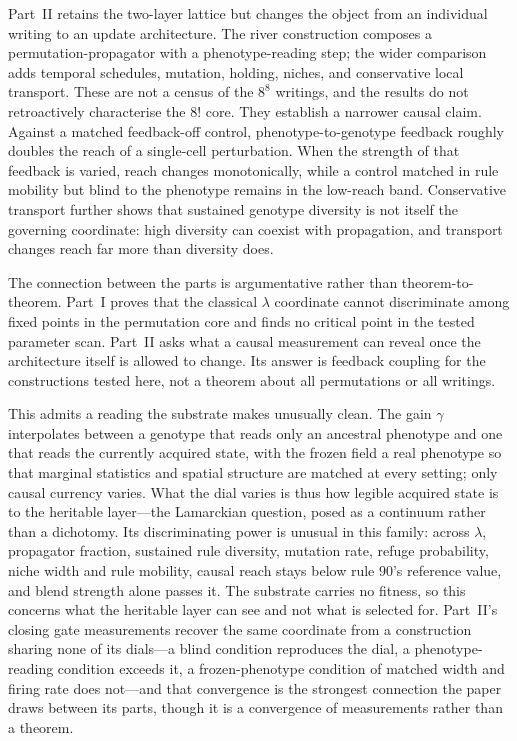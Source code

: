 \documentclass[man,12pt,floatsintext,donotrepeattitle]{apa7}
\begin{document}
Part~II retains the two-layer lattice but changes the object from an individual
writing to an update architecture. The river construction composes a
permutation-propagator with a phenotype-reading step; the wider comparison adds
temporal schedules, mutation, holding, niches, and conservative local
transport. These are not a census of the $8^8$ writings, and the results do not
retroactively characterise the $8!$ core. They establish a narrower causal
claim. Against a matched feedback-off control, phenotype-to-genotype feedback
roughly doubles the reach of a single-cell perturbation. When the strength of
that feedback is varied, reach changes monotonically, while a control matched
in rule mobility but blind to the phenotype remains in the low-reach band.
Conservative transport further shows that sustained genotype diversity is not
itself the governing coordinate: high diversity can coexist with propagation,
and transport changes reach far more than diversity does.

The connection between the parts is argumentative rather than
theorem-to-theorem. Part~I proves that the classical $\lambda$ coordinate cannot
discriminate among fixed points in the permutation core and finds no critical
point in the tested parameter scan. Part~II asks what a causal measurement can
reveal once the architecture itself is allowed to change. Its answer is
feedback coupling for the constructions tested here, not a theorem about all
permutations or all writings.

This admits a reading the substrate makes unusually clean. The gain $\gamma$
interpolates between a genotype that reads only an ancestral phenotype and one
that reads the currently acquired state, with the frozen field a real phenotype
so that marginal statistics and spatial structure are matched at every setting;
only causal currency varies. What the dial varies is thus how legible acquired
state is to the heritable layer---the Lamarckian question, posed as a continuum
rather than a dichotomy. Its discriminating power is unusual in this family:
across $\lambda$, propagator fraction, sustained rule diversity, mutation rate,
refuge probability, niche width and rule mobility, causal reach stays below rule $90$'s
reference value, and blend strength alone passes it. The substrate carries no
fitness, so this concerns what the heritable layer can see and not what is
selected for. Part~II's closing gate measurements recover the same coordinate
from a construction sharing none of its dials---a blind condition reproduces
the dial, a phenotype-reading condition exceeds it, a frozen-phenotype
condition of matched width and firing rate does not---and that convergence is
the strongest connection the paper draws between its parts, though it is a
convergence of measurements rather than a theorem.
\end{document}
